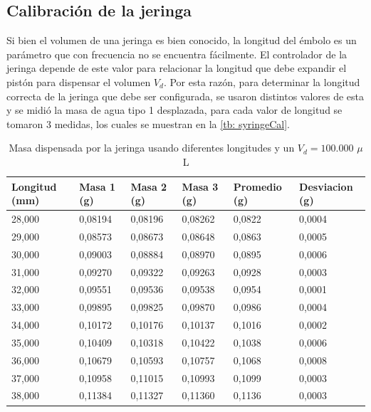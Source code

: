 	\subsection{Calibraci\'on de la jeringa}
		Si bien el volumen de una jeringa es bien conocido, la longitud del émbolo es un parámetro que con frecuencia no se encuentra fácilmente. El controlador de la jeringa depende de este valor para relacionar la longitud que debe expandir el pistón para dispensar el volumen $V_d$. Por esta razón, para determinar la longitud correcta de la jeringa que debe ser configurada, se usaron distintos valores de esta y se midió la masa de agua tipo 1 desplazada, para cada valor de longitud se tomaron 3 medidas, los cuales se muestran en la \autoref{tb: syringeCal}.
		\begin{table}[h]
			\centering
			\caption{Masa dispensada por la jeringa usando diferentes longitudes y un $V_d = 100.000$ $\mu$L}
			\small
			\begin{tabular}{p{1.7cm}|p{1.3cm}p{1.3cm}p{1.3cm}|p{2cm}p{2cm}}
				\hline
				\textbf{Longitud (mm)} &  \textbf{Masa 1 (g)} &  \textbf{Masa 2} (g) &  \textbf{Masa 3 (g)} &  \textbf{Promedio (g)} & \textbf{Desviacion (g)} \\
				\hline
				28,000 & 0,08194 & 0,08196 & 0,08262 & 0,0822 & 0,0004 \\
				29,000 & 0,08573 & 0,08673 & 0,08648 & 0,0863 & 0,0005 \\
				30,000 & 0,09003 & 0,08884 & 0,08970 & 0,0895 & 0,0006 \\
				31,000 & 0,09270 & 0,09322 & 0,09263 & 0,0928 & 0,0003 \\
				32,000 & 0,09551 & 0,09536 & 0,09538 & 0,0954 & 0,0001 \\
				33,000 & 0,09895 & 0,09825 & 0,09870 & 0,0986 & 0,0004 \\
				34,000 & 0,10172 & 0,10176 & 0,10137 & 0,1016 & 0,0002 \\
				35,000 & 0,10409 & 0,10318 & 0,10422 & 0,1038 & 0,0006 \\
				36,000 & 0,10679 & 0,10593 & 0,10757 & 0,1068 & 0,0008 \\
				37,000 & 0,10958 & 0,11015 & 0,10993 & 0,1099 & 0,0003 \\
				38,000 & 0,11384 & 0,11327 & 0,11360 & 0,1136 & 0,0003 \\
				\hline
			\end{tabular}
			\label{tb: syringeCal}
		\end{table}
		

